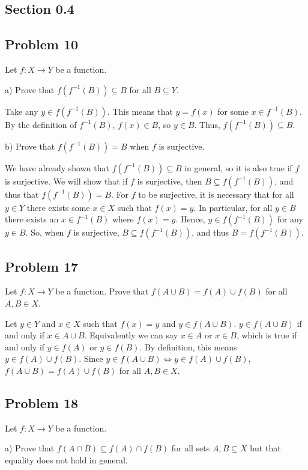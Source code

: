 \documentclass[11pt]{article}
\begin{document}
\subsection*{Section 0.4}
\subsection*{Problem 10}

Let $f: X \to Y$ be a function.

a) Prove that $f(f^{-1}(B)) \subseteq B$ for all $B \subseteq Y$.

Take any $y \in f(f^{-1}(B))$. This means that $y=f(x)$ for some $x \in f^{-1}(B)$.
By the definition of $f^{-1}(B)$, $f(x) \in B$, so $y \in B$. Thus,
$f(f^{-1}(B)) \subseteq B$. 

b) Prove that $f(f^{-1}(B)) = B$ when $f$ is surjective.

We have already shown that $f(f^{-1}(B)) \subseteq B$ in general, so it is also true
if $f$ is surjective. We will show that if $f$ is surjective, then 
$B \subseteq f(f^{-1}(B))$, and thus that $f(f^{-1}(B)) = B$. For $f$ to be surjective,
it is necessary that for all $y \in Y$ there exists some $x \in X$ such that $f(x) = y$.
In particular, for all $y \in B$ there exists an $x \in f^{-1}(B)$ where $f(x) = y$.
Hence, $y \in f(f^{-1}(B))$ for any $y \in B$. So, when $f$ is surjective,
$B \subseteq f(f^{-1}(B))$, and thus $B = f(f^{-1}(B))$.

\subsection*{Problem 17}

Let $f: X \to Y$ be a function. Prove that $f(A\cup B) = f(A) \cup f(B)$ for all
$A, B \in X$.

Let $y \in Y$ and $x \in X$ such that $f(x) = y$ and $y \in f(A\cup B)$. $y \in f(A\cup B)$
if and only if $x \in A \cup B$. Equivalently we can say $x \in A$ or $x \in B$,
which is true if
and only if $y \in f(A)$ or $y \in f(B)$. By definition, this means $y \in f(A) \cup f(B)$.
Since $y \in f(A\cup B) \iff y \in f(A) \cup f(B)$, $f(A \cup B) = f(A) \cup f(B)$ for
all $A, B \in X$.

\subsection*{Problem 18}

Let $f:X\to Y$ be a function.

a) Prove that $f(A \cap B) \subseteq f(A) \cap f(B)$ for all sets $A, B \subseteq X$
but that equality does not hold in general. 
\end{document}
